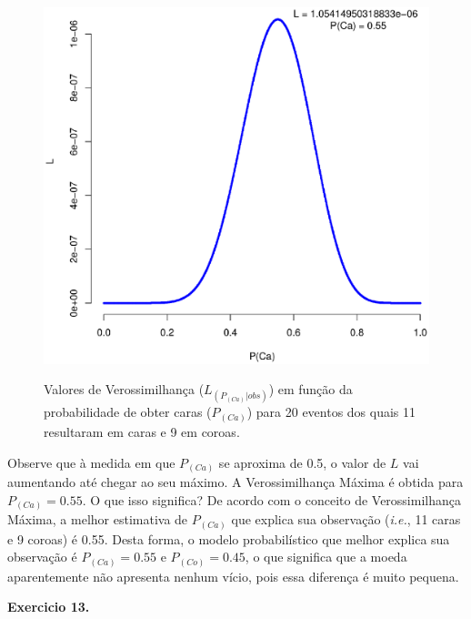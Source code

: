 \begin{refsection}
  \begin{figure}[h!]
      {\includegraphics[scale=0.55]{figures/tut12/plot_1.eps}}
      {\caption{Valores de Verossimilhança ($L_{(P_{(Ca)}|obs)}$) em função da probabilidade de obter caras ($P_{(Ca)}$) para 20 eventos dos quais 11 resultaram em caras e 9 em coroas.}\label{fig:plot1}}
  \end{figure}


Observe que à medida em que $P_{(Ca)}$ se aproxima de 0.5, o valor de $L$ vai aumentando até chegar ao seu máximo. A Verossimilhança Máxima é obtida para $P_{(Ca)} = 0.55$. O que isso significa? De acordo com o conceito de Verossimilhança Máxima, a melhor estimativa de $P_{(Ca)}$ que explica sua observação (\textit{i.e.}, 11 caras e 9 coroas) é 0.55. Desta forma, o modelo probabilístico que melhor explica sua observação é $P_{(Ca)} = 0.55$ e $P_{(Co)} = 0.45$, o que significa que a moeda aparentemente não apresenta nenhum vício, pois essa diferença é muito pequena.\\

\begin{blackBlock}{\textbf{Exercicio 13.}}\label{tut12:ex:13.1}


\end{blackBlock}
\end{refsection}
